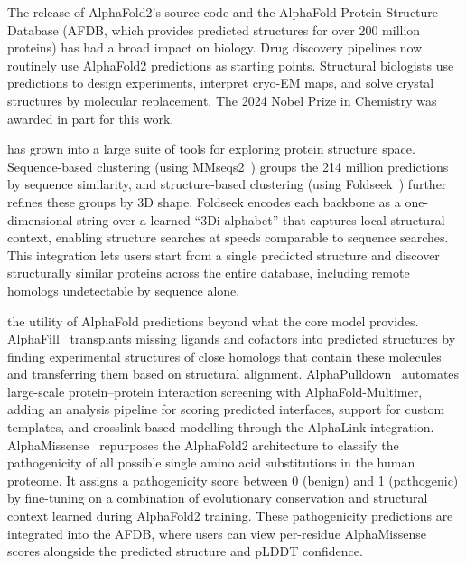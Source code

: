 The release of AlphaFold2's source code and the AlphaFold Protein Structure Database (AFDB, which provides predicted structures for over 200 million proteins) has had a broad impact on biology.
Drug discovery pipelines now routinely use AlphaFold2 predictions as starting points.
Structural biologists use predictions to design experiments, interpret cryo-EM maps, and solve crystal structures by molecular replacement.
The 2024 Nobel Prize in Chemistry was awarded in part for this work.

 has grown into a large suite of tools for exploring protein structure space.
Sequence-based clustering (using MMseqs2~\cite{steinegger2017}) groups the 214 million predictions by sequence similarity, and structure-based clustering (using Foldseek~\cite{vankempen2023}) further refines these groups by 3D shape.
Foldseek encodes each backbone as a one-dimensional string over a learned ``3Di alphabet'' that captures local structural context, enabling structure searches at speeds comparable to sequence searches.
This integration lets users start from a single predicted structure and discover structurally similar proteins across the entire database, including remote homologs undetectable by sequence alone.

 the utility of AlphaFold predictions beyond what the core model provides.
AlphaFill~\cite{hekkelman2023} transplants missing ligands and cofactors into predicted structures by finding experimental structures of close homologs that contain these molecules and transferring them based on structural alignment.
AlphaPulldown~\cite{stahl2023} automates large-scale protein--protein interaction screening with AlphaFold-Multimer, adding an analysis pipeline for scoring predicted interfaces, support for custom templates, and crosslink-based modelling through the AlphaLink integration.
AlphaMissense~\cite{cheng2023} repurposes the AlphaFold2 architecture to classify the pathogenicity of all possible single amino acid substitutions in the human proteome.
It assigns a pathogenicity score between 0 (benign) and 1 (pathogenic) by fine-tuning on a combination of evolutionary conservation and structural context learned during AlphaFold2 training.
These pathogenicity predictions are integrated into the AFDB, where users can view per-residue AlphaMissense scores alongside the predicted structure and pLDDT confidence.
